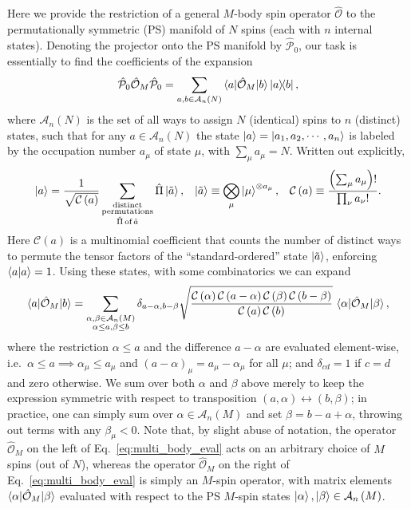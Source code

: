 \documentclass[aps,pra,nofootinbib,twocolumn,superscriptaddress]{revtex4-2}
\renewcommand{\t}{\text} %
\newcommand{\f}[2]{\dfrac{#1}{#2}} %
\newcommand{\p}[1]{\left(#1\right)} %
\newcommand{\bk}{\braket} %
\newcommand{\1}{\mathds{1}}
\renewcommand{\O}{\hat{\mathcal{O}}}
\renewcommand{\P}{\hat{\mathcal{P}}}
\newcommand{\A}{\mathcal{A}}
\newcommand{\C}{\mathcal{C}}
\begin{document}
Here we provide the restriction of a general $M$-body spin operator $\O$ to the permutationally symmetric (PS) manifold of $N$ spins (each with $n$ internal states).
Denoting the projector onto the PS manifold by $\P_0$, our task is essentially to find the coefficients of the expansion
\begin{align}
  \P_0 \O_M \P_0 = \sum_{a,b\in\A_n\p{N}} \bk{a|\O_M|b} \op{a}{b},
\end{align}
where $\A_n\p{N}$ is the set of all ways to assign $N$ (identical) spins to $n$ (distinct) states, such that for any $a\in\A_n\p{N}$ the state $\ket{a}=\ket{a_1,a_2,\cdots,a_n}$ is labeled by the occupation number $a_\mu$ of state $\mu$, with $\sum_\mu a_\mu=N$.
Written out explicitly,
\begin{align}
  \ket{a} = \f1{\sqrt{\C\p{a}}}
  \sum_{\substack{\t{distinct}\\\t{permutations}\\\hat\Pi\,\t{of}\,\tilde a}}
  \hat\Pi\ket{\tilde a},
  &&
  \ket{\tilde a} \equiv \bigotimes_\mu \ket{\mu}^{\otimes a_\mu},
  &&
  \C\p{a} \equiv \f{\p{\sum_\mu a_\mu}!}{\prod_\nu a_\nu!}.
\end{align}
Here $\C\p{a}$ is a multinomial coefficient that counts the number of distinct ways to permute the tensor factors of the ``standard-ordered'' state $\ket{\tilde a}$, enforcing $\bk{a|a}=1$.
Using these states, with some combinatorics we can expand
\begin{align}
  \bk{a|\O_M|b} =
  \sum_{\substack{\alpha,\beta\in\A_n\p{M}\\\alpha\le a,\beta\le b}}
  \delta_{a-\alpha,b-\beta}
  \sqrt{\f{\C\p{\alpha}\C\p{a-\alpha}\C\p{\beta}\C\p{b-\beta}}
    {\C\p{a}\C\p{b}}}
  \, \bk{\alpha|\O_M|\beta},
  \label{eq:multi_body_eval}
\end{align}
where the restriction $\alpha\le a$ and the difference $a-\alpha$ are evaluated element-wise, i.e.~$\alpha\le a\implies\alpha_\mu\le a_\mu$ and $\p{a-\alpha}_\mu=a_\mu-\alpha_\mu$ for all $\mu$; and $\delta_{cd}=1$ if $c=d$ and zero otherwise.
We sum over both $\alpha$ and $\beta$ above merely to keep the expression symmetric with respect to transposition $\p{a,\alpha}\leftrightarrow\p{b,\beta}$; in practice, one can simply sum over $\alpha\in\A_n\p{M}$ and set $\beta=b-a+\alpha$, throwing out terms with any $\beta_\mu<0$.
Note that, by slight abuse of notation, the operator $\O_M$ on the left of Eq.~\eqref{eq:multi_body_eval} acts on an arbitrary choice of $M$ spins (out of $N$), whereas the operator $\O_M$ on the right of Eq.~\eqref{eq:multi_body_eval} is simply an $M$-spin operator, with matrix elements $\bk{\alpha|\O_M|\beta}$ evaluated with respect to the PS $M$-spin states $\ket\alpha,\ket\beta\in\A_n\p{M}$.
\end{document}
